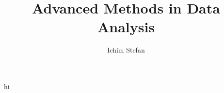 \documentclass[a4paper, 11pt]{article}
\title{\textbf{Advanced Methods in Data Analysis}}
\author{Ichim Stefan}
\begin{document}
\maketitle

hi
\end{document}
